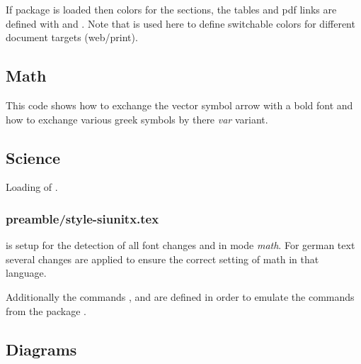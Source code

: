 If package  is loaded then colors for the sections, the tables and pdf links are defined with  and . Note that  is used here to define switchable colors for different document targets (web/print).


\subsection{Math}
\label{sec:style:math}

This code shows how to exchange the vector symbol arrow with a bold font and how to exchange various greek symbols by there \emph{var} variant.


\subsection{Science}
\label{sec:style:science}

Loading of .


\subsubsection{preamble/style-siunitx.tex}

 is setup for the detection of all font changes and in mode \emph{math}. For german text several changes are applied to ensure the correct setting of math in that language.

Additionally the commands ,  and  are defined in order to emulate the commands from the package .


\subsection{Diagrams}
\label{sec:style:diagram}


